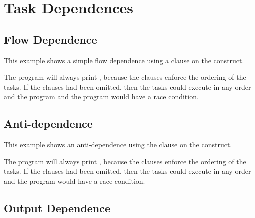 \section{Task Dependences}
\label{sec:task_depend}

\subsection{Flow Dependence}
\label{subsec:task_flow_depend}

This example shows a simple flow dependence using a  
clause on the  construct.



The program will always print , because the  
clauses enforce the ordering of the tasks. If the  clauses had been 
omitted, then the tasks could execute in any order and the program and the program 
would have a race condition.

\subsection{Anti-dependence}
\label{subsec:task_anti_depend}

This example shows an anti-dependence using the  
clause on the  construct.



The program will always print , because the  
clauses enforce the ordering of the tasks. If the  clauses had been 
omitted, then the tasks could execute in any order and the program would have a 
race condition.

\subsection{Output Dependence}
\label{subsec:task_out_depend}

